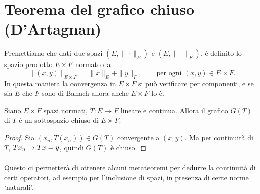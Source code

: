 \section{Teorema del grafico chiuso (D'Artagnan)}
Premettiamo che dati due spazi $(E, \|\cdot\|_E)$ e $(E, \|\cdot\|_F)$, è definito lo spazio prodotto $E \times F$ normato da
\begin{equation*}
	\|(x,y)\|_{E \times F} = \|x\|_E + \|y\|_F, \qquad \text{per ogni $(x,y) \in E \times F$}.
\end{equation*}
In questa maniera la convergenza in $E \times F$ si può verificare per componenti, e se sia $E$ che $F$ sono di Banach allora anche $E \times F$ lo è.

\begin{exercise}
	Siano $E \times F$ spazi normati, $T: E \to F$ lineare e continua. Allora il grafico $G(T)$ di $T$ è un sottospazio chiuso di $E \times F$.
\end{exercise}
\begin{proof}
	Sia $(x_n, T(x_n)) \in G(T)$ convergente a $(x,y)$. Ma per continuità di $T$, $Tx_n \underset{{}}{\rightarrow} Tx = y$, quindi $G(T)$ è chiuso.
\end{proof}

Questo ci permetterà di ottenere alcuni metateoremi per dedurre la continuità di certi operatori, ad esempio per l'inclusione di spazi, in presenza di certe norme `naturali'.

